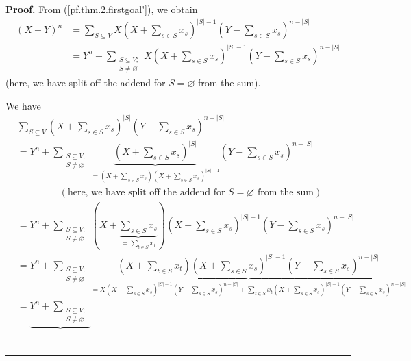 \documentclass[numbers=enddot,12pt,final,onecolumn,notitlepage]{scrartcl}%
\theoremstyle{definition}
\newenvironment{proof}[1][Proof]{\noindent\textbf{#1.} }{\ \rule{0.5em}{0.5em}}
\let\sumnonlimits\sum
\renewcommand{\sum}{\sumnonlimits\limits}
\newenvironment{vershort}{}{}
\begin{document}
\begin{vershort}
\begin{proof}
From (\ref{pf.thm.2.firstgoal'}), we obtain%
\begin{align}
\left(  X+Y\right)  ^{n}  &  =\sum_{S\subseteq V}X\left(  X+\sum_{s\in S}%
x_{s}\right)  ^{\left\vert S\right\vert -1}\left(  Y-\sum_{s\in S}%
x_{s}\right)  ^{n-\left\vert S\right\vert }\nonumber\\
&  =Y^{n}+\sum_{\substack{S\subseteq V;\\S\neq\varnothing}}X\left(
X+\sum_{s\in S}x_{s}\right)  ^{\left\vert S\right\vert -1}\left(  Y-\sum_{s\in
S}x_{s}\right)  ^{n-\left\vert S\right\vert } \label{pf.thm.2.firstgoal''}%
\end{align}
(here, we have split off the addend for $S=\varnothing$ from the sum).

We have%
\begin{align*}
&  \sum_{S\subseteq V}\left(  X+\sum_{s\in S}x_{s}\right)  ^{\left\vert
S\right\vert }\left(  Y-\sum_{s\in S}x_{s}\right)  ^{n-\left\vert S\right\vert
}\\
&  =Y^{n}+\sum_{\substack{S\subseteq V;\\S\neq\varnothing}}\underbrace{\left(
X+\sum_{s\in S}x_{s}\right)  ^{\left\vert S\right\vert }}_{=\left(
X+\sum_{s\in S}x_{s}\right)  \left(  X+\sum_{s\in S}x_{s}\right)  ^{\left\vert
S\right\vert -1}}\left(  Y-\sum_{s\in S}x_{s}\right)  ^{n-\left\vert
S\right\vert }\\
&  \ \ \ \ \ \ \ \ \ \ \ \ \ \ \ \ \ \ \ \ \left(  \text{here, we have split
off the addend for }S=\varnothing\text{ from the sum}\right) \\
&  =Y^{n}+\sum_{\substack{S\subseteq V;\\S\neq\varnothing}}\left(
X+\underbrace{\sum_{s\in S}x_{s}}_{=\sum_{t\in S}x_{t}}\right)  \left(
X+\sum_{s\in S}x_{s}\right)  ^{\left\vert S\right\vert -1}\left(  Y-\sum_{s\in
S}x_{s}\right)  ^{n-\left\vert S\right\vert }\\
&  =Y^{n}+\sum_{\substack{S\subseteq V;\\S\neq\varnothing}}\underbrace{\left(
X+\sum_{t\in S}x_{t}\right)  \left(  X+\sum_{s\in S}x_{s}\right)  ^{\left\vert
S\right\vert -1}\left(  Y-\sum_{s\in S}x_{s}\right)  ^{n-\left\vert
S\right\vert }}_{=X\left(  X+\sum_{s\in S}x_{s}\right)  ^{\left\vert
S\right\vert -1}\left(  Y-\sum_{s\in S}x_{s}\right)  ^{n-\left\vert
S\right\vert }+\sum_{t\in S}x_{t}\left(  X+\sum_{s\in S}x_{s}\right)
^{\left\vert S\right\vert -1}\left(  Y-\sum_{s\in S}x_{s}\right)
^{n-\left\vert S\right\vert }}\\
&  =\underbrace{Y^{n}+\sum_{\substack{S\subseteq V;\\S\neq\varnothing
}}}
\end{align*}
\end{proof}
\end{vershort}
\end{document}
